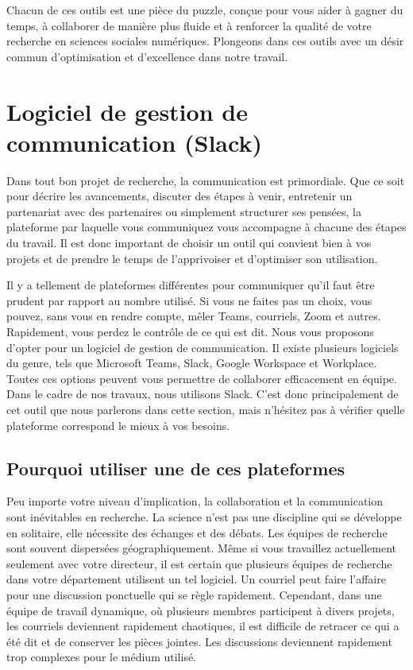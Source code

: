 \documentclass[
  letterpaper,
]{scrbook}
\begin{document}
Chacun de ces outils est une pièce du puzzle, conçue pour vous aider à
gagner du temps, à collaborer de manière plus fluide et à renforcer la
qualité de votre recherche en sciences sociales numériques. Plongeons
dans ces outils avec un désir commun d'optimisation et d'excellence dans
notre travail.

\hypertarget{logiciel-de-gestion-de-communication-slack}{%
\section{Logiciel de gestion de communication
(Slack)}\label{logiciel-de-gestion-de-communication-slack}}

Dans tout bon projet de recherche, la communication est primordiale. Que
ce soit pour décrire les avancements, discuter des étapes à venir,
entretenir un partenariat avec des partenaires ou simplement structurer
ses pensées, la plateforme par laquelle vous communiquez vous accompagne
à chacune des étapes du travail. Il est donc important de choisir un
outil qui convient bien à vos projets et de prendre le temps de
l'apprivoiser et d'optimiser son utilisation.

Il y a tellement de plateformes différentes pour communiquer qu'il faut
être prudent par rapport au nombre utilisé. Si vous ne faites pas un
choix, vous pouvez, sans vous en rendre compte, mêler Teams, courriels,
Zoom et autres. Rapidement, vous perdez le contrôle de ce qui est dit.
Nous vous proposons d'opter pour un logiciel de gestion de
communication. Il existe plusieurs logiciels du genre, tels que
Microsoft Teams, Slack, Google Workspace et Workplace. Toutes ces
options peuvent vous permettre de collaborer efficacement en équipe.
Dans le cadre de nos travaux, nous utilisons Slack. C'est donc
principalement de cet outil que nous parlerons dans cette section, mais
n'hésitez pas à vérifier quelle plateforme correspond le mieux à vos
besoins.

\hypertarget{pourquoi-utiliser-une-de-ces-plateformes}{%
\subsection{Pourquoi utiliser une de ces
plateformes}\label{pourquoi-utiliser-une-de-ces-plateformes}}

Peu importe votre niveau d'implication, la collaboration et la
communication sont inévitables en recherche. La science n'est pas une
discipline qui se développe en solitaire, elle nécessite des échanges et
des débats. Les équipes de recherche sont souvent dispersées
géographiquement. Même si vous travaillez actuellement seulement avec
votre directeur, il est certain que plusieurs équipes de recherche dans
votre département utilisent un tel logiciel. Un courriel peut faire
l'affaire pour une discussion ponctuelle qui se règle rapidement.
Cependant, dans une équipe de travail dynamique, où plusieurs membres
participent à divers projets, les courriels deviennent rapidement
chaotiques, il est difficile de retracer ce qui a été dit et de
conserver les pièces jointes. Les discussions deviennent rapidement trop
complexes pour le médium utilisé.
\end{document}
